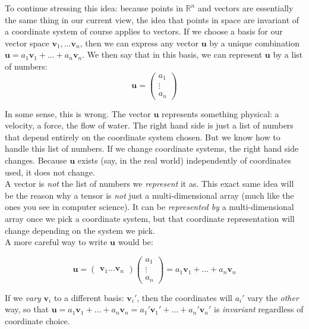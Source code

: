 	To continue stressing this idea: because points in $\mathbb R^n$ and vectors are essentially the same thing in our current view, the idea that points in space are invariant of a coordinate system of course applies to vectors. If we choose a basis for our vector space $\mathbf v_1, \dots \mathbf v_n$, then we can express any vector $\mathbf u$ by a unique combination $\mathbf u = a_1 \mathbf v_1 + \dots + a_n \mathbf v_n$. We then say that in this basis, we can represent $\mathbf u$ by a list of numbers:
	\begin{equation*}
		\mathbf u = \begin{pmatrix} a_1 \\ \vdots \\a_n	\end{pmatrix}
	\end{equation*}
	
	In some sense, this is wrong. The vector $\mathbf u$ represents something physical: a velocity, a force, the flow of water. The right hand side is just a list of numbers that depend entirely on the coordinate system chosen.  But we know how to handle this list of numbers.  If we change coordinate systems, the right hand side changes. Because $\mathbf u$ exists (say, in the real world) independently of coordinates used, it does not change.\\
	
	A vector is \emph{not} the list of numbers we \textit{represent} it as.  This exact same idea will be the reason why a tensor is \emph{not} just a multi-dimensional array (much like the ones you see in computer science). It can be \emph{represented by} a multi-dimensional array once we pick a coordinate system, but that coordinate representation will change depending on the system we pick. \\
	
	A more careful way to write $\mathbf u$ would be:
	
	\begin{equation*}
		\mathbf u = \begin{pmatrix}
			\mathbf v_1  \dots \mathbf v_n
		\end{pmatrix}\begin{pmatrix} a_1 \\ \vdots \\a_n	\end{pmatrix} = a_1 \mathbf v_1 + \dots + a_n \mathbf v_n
	\end{equation*}
	
	If we \emph{vary} $\mathbf v_i$ to a different basis: $\mathbf v_i'$, then the coordinates will $a_i'$ vary the \emph{other} way, so that $\mathbf u = a_1 \mathbf v_1 + \dots + a_n \mathbf v_n = a_1' \mathbf v_1' + \dots + a_n' \mathbf v_n'$ is \emph{invariant} regardless of coordinate choice.\\
	
